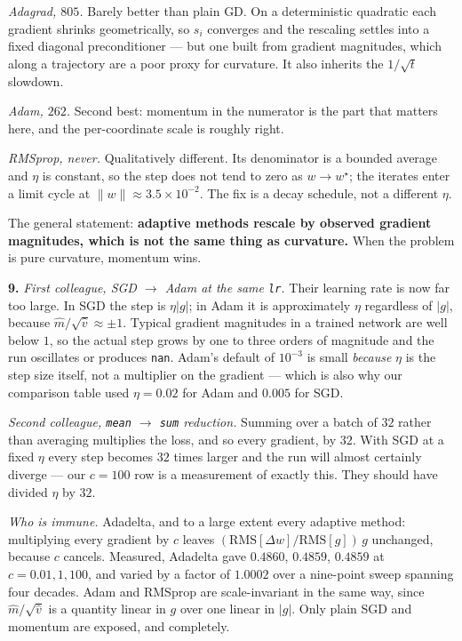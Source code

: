 \documentclass[11pt]{article}
\begin{document}
\emph{Adagrad, $805$.} Barely better than plain GD. On a deterministic
quadratic each gradient shrinks geometrically, so $s_i$ converges and the
rescaling settles into a fixed diagonal preconditioner --- but one built from
gradient magnitudes, which along a trajectory are a poor proxy for curvature.
It also inherits the $1/\sqrt{t}$ slowdown.

\emph{Adam, $262$.} Second best: momentum in the numerator is the part that
matters here, and the per-coordinate scale is roughly right.

\emph{RMSprop, never.} Qualitatively different. Its denominator is a bounded
average and $\eta$ is constant, so the step does not tend to zero as
$w \to w^\star$; the iterates enter a limit cycle at
$\lVert w\rVert \approx 3.5\times10^{-2}$. The fix is a decay schedule, not a
different $\eta$.

The general statement: \textbf{adaptive methods rescale by observed gradient
magnitudes, which is not the same thing as curvature.} When the problem is pure
curvature, momentum wins.

\medskip
\textbf{9.} \emph{First colleague, SGD $\to$ Adam at the same \texttt{lr}.}
Their learning rate is now far too large. In SGD the step is $\eta|g|$; in Adam
it is approximately $\eta$ regardless of $|g|$, because
$\hat m/\sqrt{\hat v} \approx \pm 1$. Typical gradient magnitudes in a trained
network are well below $1$, so the actual step grows by one to three orders of
magnitude and the run oscillates or produces \texttt{nan}. Adam's default of
$10^{-3}$ is small \emph{because} $\eta$ is the step size itself, not a
multiplier on the gradient --- which is also why our comparison table used
$\eta = 0.02$ for Adam and $0.005$ for SGD.

\emph{Second colleague, \texttt{mean} $\to$ \texttt{sum} reduction.} Summing
over a batch of $32$ rather than averaging multiplies the loss, and so every
gradient, by $32$. With SGD at a fixed $\eta$ every step becomes $32$ times
larger and the run will almost certainly diverge --- our $c = 100$ row is a
measurement of exactly this. They should have divided $\eta$ by $32$.

\emph{Who is immune.} Adadelta, and to a large extent every adaptive method:
multiplying every gradient by $c$ leaves
$(\mathrm{RMS}[\Delta w]/\mathrm{RMS}[g])\, g$ unchanged, because $c$ cancels.
Measured, Adadelta gave $0.4860$, $0.4859$, $0.4859$ at $c = 0.01, 1, 100$, and
varied by a factor of $1.0002$ over a nine-point sweep spanning four decades.
Adam and RMSprop are scale-invariant in the same way, since
$\hat m/\sqrt{\hat v}$ is a quantity linear in $g$ over one linear in $|g|$.
Only plain SGD and momentum are exposed, and completely.
\end{document}
